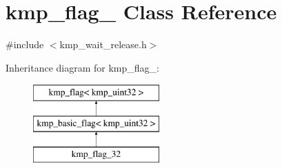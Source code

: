 \hypertarget{classkmp__flag__32}{\section{kmp\-\_\-flag\-\_ Class Reference}
\label{classkmp__flag__32}
}


{\ttfamily \#include $<$kmp\-\_\-wait\-\_\-release.\-h$>$}

Inheritance diagram for kmp\-\_\-flag\-\_\-:\begin{figure}[H]
\begin{center}
\leavevmode
\includegraphics[height=3.000000cm]{classkmp__flag__32}
\end{center}
\end{figure}
